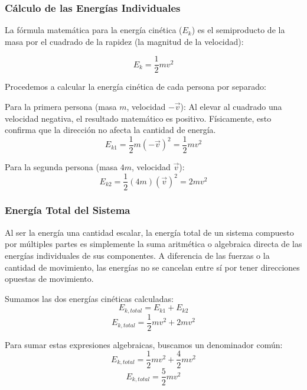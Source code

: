 \documentclass[12pt, a4paper]{article}
\begin{document}
\subsubsection*{Cálculo de las Energías Individuales}

La fórmula matemática para la energía cinética ($E_k$) es el semiproducto de la masa por el cuadrado de la rapidez (la magnitud de la velocidad):

\begin{equation}
E_k = \frac{1}{2}mv^2
\end{equation}

Procedemos a calcular la energía cinética de cada persona por separado:

Para la primera persona (masa $m$, velocidad $-\vec{v}$):
Al elevar al cuadrado una velocidad negativa, el resultado matemático es positivo. Físicamente, esto confirma que la dirección no afecta la cantidad de energía.
\begin{equation}
E_{k1} = \frac{1}{2}m(-\vec{v})^2 = \frac{1}{2}mv^2
\end{equation}

Para la segunda persona (masa $4m$, velocidad $\vec{v}$):
\begin{equation}
E_{k2} = \frac{1}{2}(4m)(\vec{v})^2 = 2mv^2
\end{equation}

\subsubsection*{Energía Total del Sistema}

Al ser la energía una cantidad escalar, la energía total de un sistema compuesto por múltiples partes es simplemente la suma aritmética o algebraica directa de las energías individuales de sus componentes. A diferencia de las fuerzas o la cantidad de movimiento, las energías no se cancelan entre sí por tener direcciones opuestas de movimiento.

Sumamos las dos energías cinéticas calculadas:
\begin{equation}
E_{k,total} = E_{k1} + E_{k2}
\end{equation}
\begin{equation}
E_{k,total} = \frac{1}{2}mv^2 + 2mv^2
\end{equation}

Para sumar estas expresiones algebraicas, buscamos un denominador común:
\begin{equation}
E_{k,total} = \frac{1}{2}mv^2 + \frac{4}{2}mv^2
\end{equation}
\begin{equation}
E_{k,total} = \frac{5}{2}mv^2
\end{equation}
\end{document}
